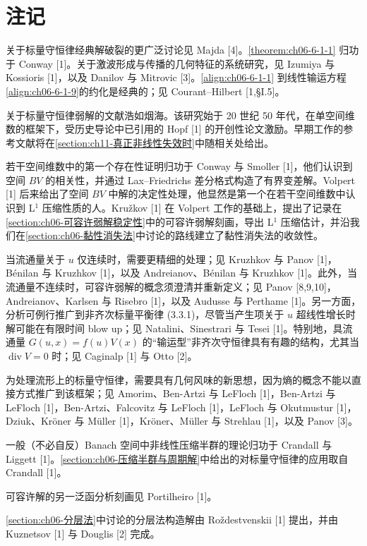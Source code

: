 \documentclass[../../main.tex]{subfiles}
\begin{document}
\section{注记}\label{section:ch06-注记}

关于标量守恒律经典解破裂的更广泛讨论见 Majda [4]。\cref{theorem:ch06-6-1-1} 归功于 Conway [1]。关于激波形成与传播的几何特征的系统研究，见 Izumiya 与 Kossioris [1]，以及 Danilov 与 Mitrovic [3]。\eqref{align:ch06-6-1-1} 到线性输运方程\eqref{align:ch06-6-1-9}的约化是经典的；见 Courant--Hilbert [1,§I.5]。

关于标量守恒律弱解的文献浩如烟海。该研究始于 20 世纪 50 年代，在单空间维数的框架下，受历史导论中已引用的 Hopf [1] 的开创性论文激励。早期工作的参考文献将在\cref{section:ch11-真正非线性失效时}中随相关处给出。


若干空间维数中的第一个存在性证明归功于 Conway 与 Smoller [1]，他们认识到空间 $BV$ 的相关性，并通过 Lax--Friedrichs 差分格式构造了有界变差解。Volpert [1] 后来给出了空间 $BV$ 中解的决定性处理，他显然是第一个在若干空间维数中认识到 L$^{1}$ 压缩性质的人。Kružkov [1] 在 Volpert 工作的基础上，提出了记录在\cref{section:ch06-可容许弱解稳定性}中的可容许弱解刻画，导出 L$^{1}$ 压缩估计，并沿我们在\cref{section:ch06-黏性消失法}中讨论的路线建立了黏性消失法的收敛性。

当流通量关于 $u$ 仅连续时，需要更精细的处理；见 Kruzhkov 与 Panov [1]，Bénilan 与 Kruzhkov [1]，以及 Andreianov、Bénilan 与 Kruzhkov [1]。此外，当流通量不连续时，可容许弱解的概念须澄清并重新定义；见 Panov [8,9,10]，Andreianov、Karlsen 与 Risebro [1]，以及 Audusse 与 Perthame [1]。另一方面，分析可例行推广到非齐次标量平衡律 (3.3.1)，尽管当产生项关于 $u$ 超线性增长时解可能在有限时间 blow up；见 Natalini、Sinestrari 与 Tesei [1]。特别地，具流通量 $G(u,x)=f(u)V(x)$ 的“输运型”非齐次守恒律具有有趣的结构，尤其当 $\operatorname{div}V=0$ 时；见 Caginalp [1] 与 Otto [2]。

为处理流形上的标量守恒律，需要具有几何风味的新思想，因为熵的概念不能以直接方式推广到该框架；见 Amorim、Ben-Artzi 与 LeFloch [1]，Ben-Artzi 与 LeFloch [1]，Ben-Artzi、Falcovitz 与 LeFloch [1]，LeFloch 与 Okutmustur [1]，Dziuk、Kröner 与 Müller [1]，Kröner、Müller 与 Strehlau [1]，以及 Panov [3]。

一般（不必自反）Banach 空间中非线性压缩半群的理论归功于 Crandall 与 Liggett [1]。\cref{section:ch06-压缩半群与周期解}中给出的对标量守恒律的应用取自 Crandall [1]。

可容许解的另一泛函分析刻画见 Portilheiro [1]。

\cref{section:ch06-分层法}中讨论的分层法构造解由 Roždestvenskii [1] 提出，并由 Kuznetsov [1] 与 Douglis [2] 完成。
\end{document}

